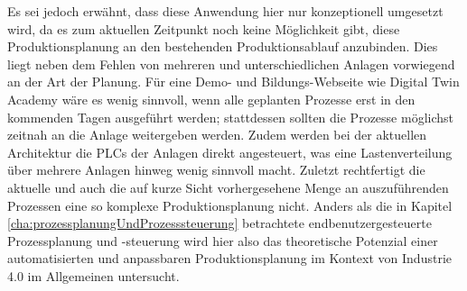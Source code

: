 Es sei jedoch erwähnt, dass diese Anwendung hier nur konzeptionell umgesetzt wird, da es zum aktuellen Zeitpunkt noch keine Möglichkeit gibt, diese Produktionsplanung an den bestehenden Produktionsablauf anzubinden. Dies liegt neben dem Fehlen von mehreren und unterschiedlichen Anlagen vorwiegend an der Art der Planung. Für eine Demo- und Bildungs-Webseite wie Digital Twin Academy wäre es wenig sinnvoll, wenn alle geplanten Prozesse erst in den kommenden Tagen ausgeführt werden; stattdessen sollten die Prozesse möglichst zeitnah an die Anlage weitergeben werden. Zudem werden bei der aktuellen Architektur die PLCs der Anlagen direkt angesteuert, was eine Lastenverteilung über mehrere Anlagen hinweg wenig sinnvoll macht. Zuletzt rechtfertigt die aktuelle und auch die auf kurze Sicht vorhergesehene Menge an auszuführenden Prozessen eine so komplexe Produktionsplanung nicht. Anders als die in Kapitel \ref{cha:prozessplanungUndProzesssteuerung} betrachtete endbenutzergesteuerte Prozessplanung und -steuerung wird hier also das theoretische Potenzial einer automatisierten und anpassbaren Produktionsplanung im Kontext von Industrie 4.0 im Allgemeinen untersucht.
